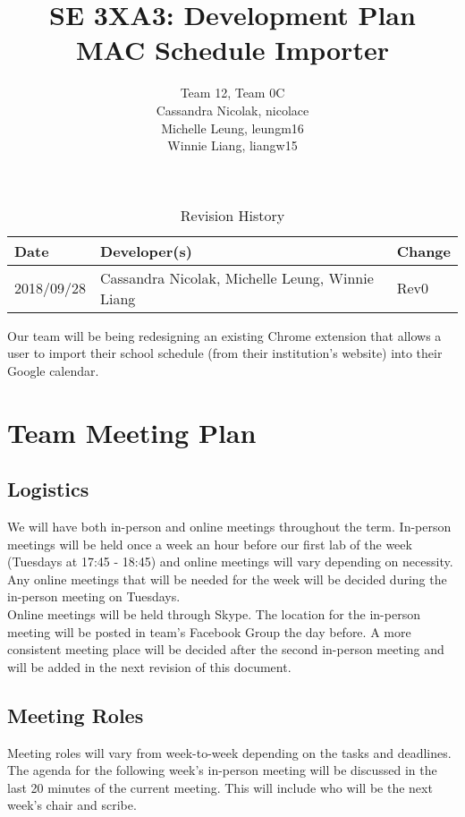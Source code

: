 \documentclass{article}
\title{SE 3XA3: Development Plan\\MAC Schedule Importer}
\author{Team 12, Team 0C
		\\ Cassandra Nicolak, nicolace
		\\ Michelle Leung, leungm16
		\\ Winnie Liang, liangw15
}
\date{}
\begin{document}
\begin{table}[hp]
\caption{Revision History} \label{TblRevisionHistory}
\begin{tabularx}{\textwidth}{llX}
\toprule
\textbf{Date} & \textbf{Developer(s)} & \textbf{Change}\\
\midrule
2018/09/28 & Cassandra Nicolak, Michelle Leung, Winnie Liang & Rev0\\
\bottomrule
\end{tabularx}
\end{table}

\newpage

\maketitle

Our team will be being redesigning an existing Chrome extension that allows a user to import their school schedule (from their institution's website) into their Google calendar.


\section{Team Meeting Plan}
\subsection{Logistics}
\hspace{5mm}We will have both in-person and online meetings throughout the term. In-person meetings will be held once a week an hour before our first lab of the week (Tuesdays at 17:45 - 18:45) and online meetings will vary depending on necessity. Any online meetings that will be needed for the week will be decided during the in-person meeting on Tuesdays. \\

Online meetings will be held through Skype. The location for the in-person meeting will be posted in team's Facebook Group the day before. A more consistent meeting place will be decided after the second in-person meeting and will be added in the next revision of this document.

\subsection{Meeting Roles}
\hspace{5mm}Meeting roles will vary from week-to-week depending on the tasks and deadlines. The agenda for the following week's in-person meeting will be discussed in the last 20 minutes of the current meeting. This will include who will be the next week's chair and scribe.\\
\end{document}
